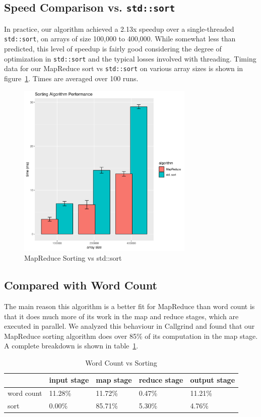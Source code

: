 \documentclass[12pt, letterpaper]{article}
\begin{document}
\subsection{Speed Comparison vs. \texttt{std::sort}}
	In practice, our algorithm achieved a 2.13x speedup over a single-threaded \texttt{std::sort}, on arrays of size 100,000 to 400,000.
	While somewhat less than predicted, this level of speedup is fairly good considering the degree of optimization in \texttt{std::sort} and the typical losses involved with threading.
	Timing data for our MapReduce sort vs \texttt{std::sort} on various array sizes is shown in figure~\ref{fig:sort-timing}. Times are averaged over 100 runs.

	\begin{figure}[!h]
	\centering
	\includegraphics[width=0.75\textwidth]{sort-timing}
	\caption{MapReduce Sorting vs std::sort\label{fig:sort-timing}}
	\end{figure}

\subsection{Compared with Word Count}
	The main reason this algorithm is a better fit for MapReduce than word count is that it does much more of its work in the map and reduce stages, which are executed in parallel.
	We analyzed this behaviour in Callgrind and found that our MapReduce sorting algorithm does over 85\% of its computation in the map stage.
	A complete breakdown is shown in table~\ref{table:sortVwordcount}.

	\begin{table}[!h]\centering
	\renewcommand{\arraystretch}{1.3}
		\begin{tabular}{@{}lllll@{}}
			\toprule
			 & input stage & map stage & reduce stage & output stage\\ \midrule
			word count	&11.28\%	&11.72\%	&0.47\%	&11.21\%\\
			sort		&0.00\%		&85.71\%	&5.30\%	&4.76\%	\\
			\bottomrule
		\end{tabular}
		\caption{Word Count vs Sorting\label{table:sortVwordcount}}
	\end{table}
\end{document}
